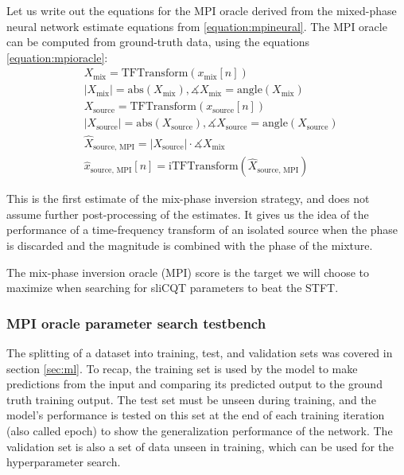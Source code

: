 \documentclass[report.tex]{subfiles}
\begin{document}
Let us write out the equations for the MPI oracle derived from the mixed-phase neural network estimate equations from \eqref{equation:mpineural}. The MPI oracle can be computed from ground-truth data, using the equations \eqref{equation:mpioracle}:
\begin{align}\tag{4}\label{equation:mpioracle}
	\nonumber & X_{\text{mix}} = \text{TFTransform}(x_{\text{mix}}[n])\\
	\nonumber & |X_{\text{mix}}| = \text{abs}(X_{\text{mix}}), \measuredangle{X_{\text{mix}}} = \text{angle}(X_{\text{mix}})\\
	\nonumber & X_{\text{source}} = \text{TFTransform}(x_{\text{source}}[n])\\
	\nonumber & |X_{\text{source}}| = \text{abs}(X_{\text{source}}), \measuredangle{X_{\text{source}}} = \text{angle}(X_{\text{source}})\\
	\nonumber & \hat{X}_{\text{source, MPI}} = |X_{\text{source}}| \cdot \measuredangle{X_{\text{mix}}}\\
	\nonumber & \hat{x}_{\text{source, MPI}}[n] = \text{iTFTransform}(\hat{X}_{\text{source, MPI}})
\end{align}

This is the first estimate of the mix-phase inversion strategy, and does not assume further post-processing of the estimates. It gives us the idea of the performance of a time-frequency transform of an isolated source when the phase is discarded and the magnitude is combined with the phase of the mixture.

The mix-phase inversion oracle (MPI) score is the target we will choose to maximize when searching for sliCQT parameters to beat the STFT.

\subsubsection{MPI oracle parameter search testbench}
\label{sec:mpiparam}

The splitting of a dataset into training, test, and validation sets was covered in section \ref{sec:ml}. To recap, the training set is used by the model to make predictions from the input and comparing its predicted output to the ground truth training output. The test set must be unseen during training, and the model's performance is tested on this set at the end of each training iteration (also called epoch) to show the generalization performance of the network. The validation set is also a set of data unseen in training, which can be used for the hyperparameter search.
\end{document}
